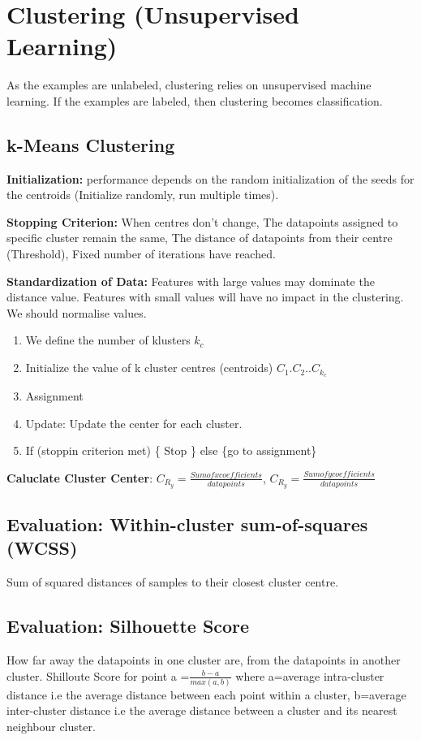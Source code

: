 \section{Clustering (Unsupervised Learning)}
As the examples are unlabeled, clustering relies on unsupervised machine learning. If the examples are labeled, then clustering becomes classification.

\subsection{k-Means Clustering}
\textbf{Initialization:} performance depends on the random initialization of the seeds for the centroids (Initialize randomly, run multiple times). 

\textbf{Stopping Criterion:}  When centres don’t change,  The datapoints assigned to specific cluster remain the same,  The distance of datapoints from their centre (Threshold),  Fixed number of iterations have reached.

\textbf{Standardization of Data:} Features with large values may dominate the distance value. Features with small values will have no impact in the clustering. We should normalise values.

\begin{enumerate}
	\itemsep -0.5em
  	\item We define the number of klusters $k_{c}$
  	\item Initialize the value of k cluster centres (centroids) $C_{1}. C_{2}..C_{k_{c}}$
  	\item Assignment
  	\item Update: Update the center for each cluster.
  	\item If (stoppin criterion met) \{ Stop \} else \{go to assignment\}
\end{enumerate}

\textbf{Caluclate Cluster Center}: $C_{R_y} = \frac{Sum of x coefficients}{data points}$, $C_{R_y} = \frac{Sum of y coefficients}{data points}$ 

\subsection{Evaluation: Within-cluster sum-of-squares (WCSS) }
Sum of squared distances of samples to their closest cluster centre.

\subsection{Evaluation: Silhouette Score} 
How far away the datapoints in one cluster are, from the datapoints in another cluster. Shilloute Score for point a  =$\frac{b-a}{max(a,b)}$ where a=average intra-cluster distance i.e the average distance between each point within a cluster, b=average inter-cluster distance i.e the average distance between a cluster and its nearest neighbour cluster.

